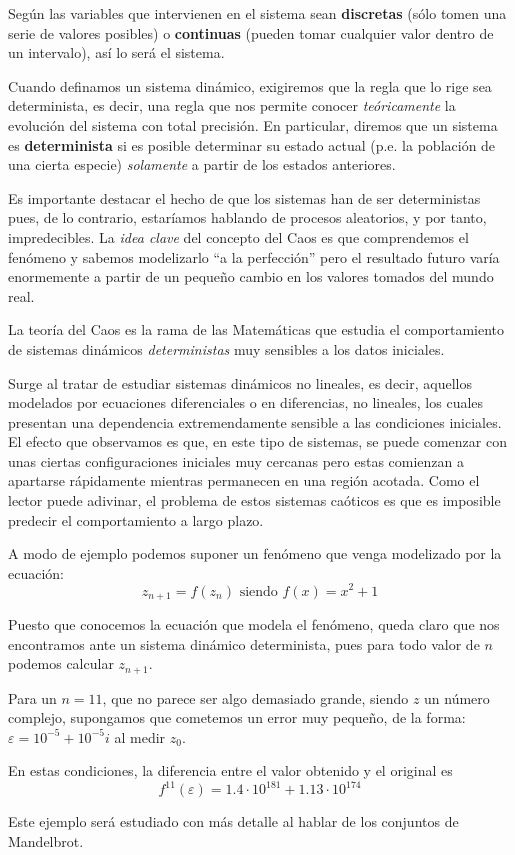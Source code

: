 Según las variables que intervienen en el sistema sean \textbf{discretas} (sólo tomen una serie de valores posibles) o \textbf{continuas} (pueden tomar cualquier valor dentro de un intervalo), así lo será el sistema.

Cuando definamos un sistema dinámico, exigiremos que la regla que lo rige sea determinista, es decir, una regla que nos permite conocer \emph{teóricamente} la evolución del sistema con total precisión. En particular, diremos que un sistema es \textbf{determinista} si es posible determinar su estado actual (p.e. la población de una cierta especie) \emph{solamente} a partir de los estados anteriores.

Es importante destacar el hecho de que los sistemas han de ser deterministas pues, de lo contrario, estaríamos hablando de procesos aleatorios, y por tanto, impredecibles. La \emph{idea clave} del concepto del Caos es que comprendemos el fenómeno y sabemos modelizarlo ``a la perfección'' pero el resultado futuro varía enormemente a partir de un pequeño cambio en los valores tomados del mundo real.


\begin{definition}
La teoría del Caos es la rama de las Matemáticas que estudia el comportamiento de sistemas dinámicos \emph{deterministas} muy sensibles a los datos iniciales.
\end{definition}
Surge al tratar de estudiar sistemas dinámicos no lineales, es decir, aquellos modelados por ecuaciones diferenciales o en diferencias, no lineales, los cuales presentan una dependencia extremendamente sensible a las condiciones iniciales. El efecto que observamos es que, en este tipo de sistemas, se puede comenzar con unas ciertas configuraciones iniciales muy cercanas pero estas comienzan a apartarse rápidamente mientras permanecen en una región acotada. Como el lector puede adivinar, el problema de estos sistemas caóticos es que es imposible predecir el comportamiento a largo plazo.
\begin{example}\label{example:Julia}
A modo de ejemplo podemos suponer un fenómeno que venga modelizado por la ecuación:
\[z_{n+1} = f(z_n) \text{ siendo } f(x) = x^2+1\]

Puesto que conocemos la ecuación que modela el fenómeno, queda claro que nos encontramos ante un sistema dinámico determinista, pues para todo valor de $n$ podemos calcular $z_{n+1}$.

Para un $n=11$, que no parece ser algo demasiado grande, siendo $z$ un número complejo, supongamos que cometemos un error muy pequeño, de la forma: $ε=10^{-5}+10^{-5}i$ al medir $z_0$.

En estas condiciones, la diferencia entre el valor obtenido y el original es
\[f^{11}(ε)=1.4 \cdot 10^{181} + 1.13\cdot 10^{174}\]

Este ejemplo será estudiado con más detalle al hablar de los conjuntos de Mandelbrot.
\end{example}

